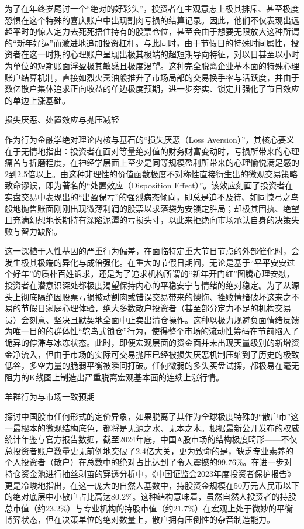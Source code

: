 \documentclass{cupb-thesis}
\begin{document}
为了在年终岁尾讨一个“绝对的好彩头”，投资者在主观意志上极其排斥、甚至极度恐惧在这个特殊的喜庆账户中出现割肉亏损的结算记录。因此，他们不仅表现出远超平时的惊人定力去死死捂住持有的股票仓位，甚至会由于想要无限放大这种所谓的“新年好运”而激进地追加投资杠杆。与此同时，由于节假日的特殊时间属性，投资者在这一时期的心理账户呈现出极其极端的超短期导向特征，对以日甚至以小时为单位的短期账面浮盈极其敏感且极度渴望。这种完全脱离企业基本面的特殊心理账户结算机制，直接如烈火烹油般推升了市场局部的交易换手率与活跃度，并由于数亿散户集体追求正向收益的单边极度预期，进一步夯实、锁定并强化了节日效应的单边上涨基础。


损失厌恶、处置效应与抛压减轻

作为行为金融学绝对理论内核与基石的“损失厌恶（Loss Aversion）”，其核心要义在于无情地指出：投资者在面对等量绝对值的财务财富变动时，亏损所带来的心理痛苦与折磨程度，在神经学层面上至少是同等规模盈利所带来的心理愉悦满足感的2到2.5倍以上。由这种非理性的价值函数极度不对称性直接衍生出的微观交易策略致命谬误，即为著名的“处置效应（Disposition Effect）”。该效应刻画了投资者在实盘交易中表现出的“出盈保亏”的强烈病态倾向，即总是迫不及待、如同惊弓之鸟般地抛售账面刚刚出现微薄利润的股票以求落袋为安锁定胜局；却极其固执、绝望且充满幻想地长期持有深陷泥潭的亏损头寸，以此来拒绝向市场承认自身的决策失败与智力缺陷。


这一深植于人性基因的严重行为偏差，在面临特定重大节日节点的外部催化时，会发生极其极端的异化与成倍强化。在重大的节假日期间，无论是基于“平平安安过个好年”的质朴百姓诉求，还是为了追求机构所谓的“新年开门红”图腾心理安慰，投资者在潜意识深处都极度渴望保持内心的平稳安宁与情绪的绝对稳定。为了从源头上彻底隔绝因股票亏损被动割肉或错误交易带来的懊悔、挫败情绪破坏这来之不易的节假日家庭心理体验，绝大多数散户投资者（甚至部分定力不足的机构交易员）会刻意、坚决且默契地全面中止卖出清仓操作。这种以极力规避负面情绪反馈为唯一目的的群体性“鸵鸟式锁仓”行为，使得整个市场的流动性筹码在节前陷入了诡异的停滞与冰冻状态。此时，即便宏观层面的资金面并未出现天量级别的新增资金净流入，但由于市场的实际可交易抛压已经被损失厌恶机制压缩到了历史的极致低谷，多空力量的脆弱平衡被瞬间打破。任何微弱的多头买盘试探，都极易在毫无阻力的K线图上制造出严重脱离宏观基本面的连续上涨行情。


羊群行为与市场一致预期

探讨中国股市任何形式的定价异象，如果脱离了其作为全球极度特殊的“散户市”这一最根本的微观结构底色，都将是无源之水、无本之木。根据最新公开发布的权威统计年鉴与官方报告数据，截至2024年底，中国A股市场的结构极度畸形——不仅总投资者账户数量史无前例地突破了2.4亿大关，更为致命的是，缺乏专业素养的个人投资者（散户）在总数中的绝对占比达到了令人震撼的99.76\%。在进一步对持仓资金池进行抽丝剥茧的穿透分析中，《中国证监会2023年度投资者保护报告》更是冷峻地指出，在这一庞大的自然人基数中，持股资金规模在50万元人民币以下的绝对底层中小散户占比高达80.2\%。这种结构意味着，虽然自然人投资者的持股总市值（约23.2\%）与专业机构的持股市值（约21.7\%）在宏观上处于微妙的平衡博弈状态，但在决策单位的绝对数量上，散户拥有压倒性的杂音制造能力。
\end{document}
